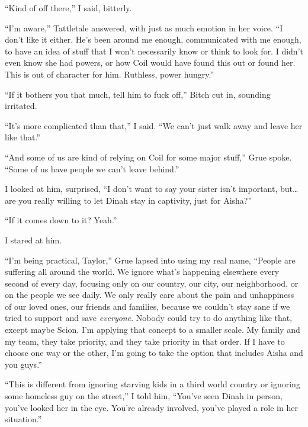 ``Kind of off there,'' I said, bitterly.



``I'm aware,'' Tattletale answered, with just as much emotion in her voice.  ``I don't like it either.  He's been around me enough, communicated with me enough, to have an idea of stuff that I won't necessarily know or think to look for.  I didn't even know she had powers, or how Coil would have found this out or found her.  This is out of character for him.  Ruthless, power hungry.''



``If it bothers you that much, tell him to fuck off,'' Bitch cut in, sounding irritated.



``It's more complicated than that,'' I said.  ``We can't just walk away and leave her like that.''



``And some of us are kind of relying on Coil for some major stuff,'' Grue spoke.  ``Some of us have people we can't leave behind.''



I looked at him, surprised, ``I don't want to say your sister isn't important, but\ldots are you really willing to let Dinah stay in captivity, just for Aisha?''



``If it comes down to it?  Yeah.''



I stared at him.



``I'm being practical, Taylor,'' Grue lapsed into using my real name, ``People are suffering all around the world.  We ignore what's happening elsewhere every second of every day, focusing only on our country, our city, our neighborhood, or on the people we see daily.  We only really care about the pain and unhappiness of our loved ones, our friends and families, because we couldn't stay sane if we tried to support and save \emph{everyone}.  Nobody could try to do anything like that, except maybe Scion.  I'm applying that concept to a smaller scale.  My family and my team, they take priority, and they take priority in that order.  If I have to choose one way or the other, I'm going to take the option that includes Aisha and you guys.''



``This is different from ignoring starving kids in a third world country or ignoring some homeless guy on the street,'' I told him, ``You've seen Dinah in person, you've looked her in the eye.  You're already involved, you've played a role in her situation.''



